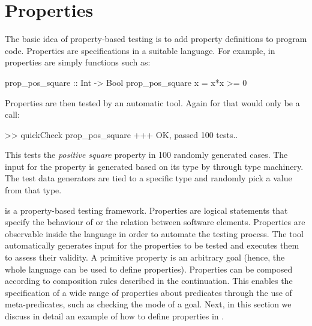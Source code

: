 

\section{Properties}
\label{sec:properties}

The basic idea of property-based testing is to add property definitions
to program code.
%
Properties are specifications in a suitable language.
%
For example, in \QuickCheck{} properties are simply \Haskell{} functions such as:
%
\begin{code}
 prop_pos_square :: Int -> Bool
 prop_pos_square x = x*x >= 0
\end{code}

Properties are then tested by an automatic tool.
%
Again for \Haskell{} \QuickCheck{} that would only be a call:
%
\begin{code}
 >> quickCheck prop_pos_square
 +++ OK, passed 100 tests..
\end{code}
%
This tests the \emph{positive square} property in 100 randomly
generated cases.
%
The input for the property is generated based on its type by
\QuickCheck{} through type machinery.
%
The test data generators are tied to a specific type and randomly pick a
value from that type.


\plqc{} is a property-based testing framework.
%
Properties are logical statements that specify the behaviour of or the relation between software
elements.
%
Properties are observable inside the language in order to automate the testing process.
%
The tool automatically generates input for the properties to be tested
and executes them to assess their validity.
%
A primitive property is an arbitrary \Prolog{} goal (hence, the whole
language can be used to define properties).
%
Properties can be composed according to composition
rules described in the continuation.
%
%
%
%
This enables the specification of a wide range of properties about
predicates through the use of meta-predicates, such as checking
the mode of a goal. %
%
Next, in this section we discuss in detail an example of how to define
properties in \plqc{}.


